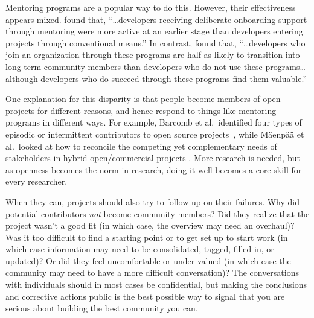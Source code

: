 \documentclass[10pt,letterpaper]{article}
\begin{document}
Mentoring programs are a popular way to do this.
However,
their effectiveness appears mixed.
\cite{fagerholm2014} found that,
``{\ldots}developers receiving deliberate onboarding support through mentoring
were more active at an earlier stage than developers entering projects through conventional means.''
In contrast,
\cite{labuschagne2015} found that,
``{\ldots}developers who join an organization through these programs
are half as likely to transition into long-term community members
than developers who do not use these programs{\ldots}
although developers who do succeed through these programs find them valuable.''

One explanation for this disparity is that people become members of open projects for different reasons,
and hence respond to things like mentoring programs in different ways.
For example,
Barcomb et al.\ identified four types of episodic or intermittent contributors to open source projects~\cite{barcomb2019},
while M\"{a}enp\"{a}\"{a} et al.\ looked at how to reconcile
the competing yet complementary needs of stakeholders in hybrid open/commercial projects \cite{maenpaa2018}.
More research is needed,
but as openness becomes the norm in research,
doing it well becomes a core skill for every researcher.

When they can,
projects should also try to follow up on their failures.
Why did potential contributors \emph{not} become community members?
Did they realize that the project wasn't a good fit
(in which case, the overview may need an overhaul)?
Was it too difficult to find a starting point or to get set up to start work
(in which case information may need to be consolidated, tagged, filled in, or updated)?
Or did they feel uncomfortable or under-valued
(in which case the community may need to have a more difficult conversation)?
The conversations with individuals should in most cases be confidential,
but making the conclusions and corrective actions public
is the best possible way to signal that you are serious about building the best community you can.
\end{document}
